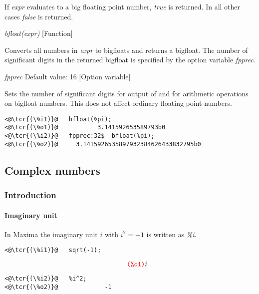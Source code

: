 \documentclass[../Maxima_Workbook.tex]{subfiles}
\begin{document}
\lz If \emph{expr} evaluates to a big floating point number, \emph{true} is returned. In all other cases \emph{false} is returned.

\lzz \emph{bfloat(expr)} \hfill [Function]

\lz Converts all numbers in \emph{expr} to bigfloats and returns a bigfloat. The number of significant digits in the returned bigfloat is specified by the option variable \emph{fpprec}.

\lzz \emph{fpprec} \qquad Default value: 16 \hfill [Option variable]

\lz Sets the number of significant digits for output of and for arithmetic operations on bigfloat numbers. This does not affect ordinary floating point numbers.

\begin{lstlisting}
<@\tcr{(\%i1)}@   bfloat(%pi);
<@\tcr{(\%o1)}@		      3.141592653589793b0
<@\tcr{(\%i2)}@   fpprec:32$  bfloat(%pi);
<@\tcr{(\%o2)}@		3.1415926535897932384626433832795b0
\end{lstlisting}

\subsection{Complex numbers}

 

\subsubsection{Introduction}

\paragraph{Imaginary unit} \mbox{}

\lzz {} \hfill {}

\lz In Maxima the imaginary unit $i$ with $ i^2 = -1 $ is written as \emph{\%i}.

\vspace{1mm}\begin{small}
\color{blue} \leqn
\begin{lstlisting}
<@\tcr{(\%i1)}@   sqrt(-1);
\end{lstlisting}
\vspace{-6mm} \[\tag*{\tcr{\ttfamily (\%o1)}} i \]
\vspace{-10mm} 
\begin{lstlisting}
<@\tcr{(\%i2)}@   %i^2;
<@\tcr{(\%o2)}@				-1
\end{lstlisting}
\color{black} \reqn
\end{small}
\vspace{-2mm} 
\end{document}
